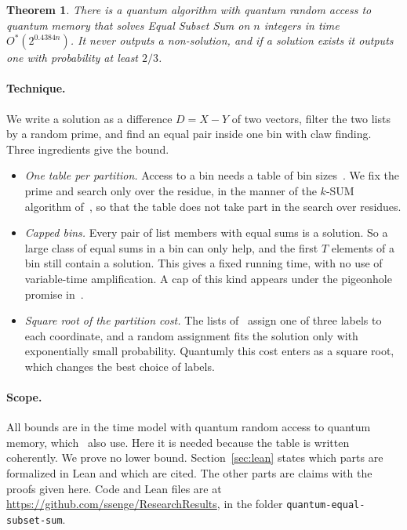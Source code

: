 \documentclass[11pt]{article}
\newtheorem{theorem}{Theorem}[section]
\theoremstyle{remark}
\begin{document}
\begin{theorem}\label{thm:main}
There is a quantum algorithm with quantum random access to quantum memory that solves Equal Subset Sum on $n$ integers in time $O^*(2^{0.4384n})$. It never outputs a non-solution, and if a solution exists it outputs one with probability at least $2/3$.
\end{theorem}

\paragraph{Technique.} We write a solution as a difference $D=X-Y$ of two vectors, filter the two lists by a random prime, and find an equal pair inside one bin with claw finding. Three ingredients give the bound.
\begin{itemize}[leftmargin=1.5em]
\item \emph{One table per partition.} Access to a bin needs a table of bin sizes~\cite{AHJKS22}. We fix the prime and search only over the residue, in the manner of the $k$-SUM algorithm of~\cite{CKLM26}, so that the table does not take part in the search over residues.
\item \emph{Capped bins.} Every pair of list members with equal sums is a solution. So a large class of equal sums in a bin can only help, and the first $T$ elements of a bin still contain a solution. This gives a fixed running time, with no use of variable-time amplification. A cap of this kind appears under the pigeonhole promise in~\cite[Theorem 6.3]{AHJKS22}.
\item \emph{Square root of the partition cost.} The lists of~\cite{Ye26} assign one of three labels to each coordinate, and a random assignment fits the solution only with exponentially small probability. Quantumly this cost enters as a square root, which changes the best choice of labels.
\end{itemize}

\paragraph{Scope.} All bounds are in the time model with quantum random access to quantum memory, which~\cite{AHJKS22,CKLM26} also use. Here it is needed because the table is written coherently. We prove no lower bound. Section~\ref{sec:lean} states which parts are formalized in Lean and which are cited. The other parts are claims with the proofs given here. Code and Lean files are at \url{https://github.com/ssenge/ResearchResults}, in the folder \texttt{quantum-equal-subset-sum}.
\end{document}
